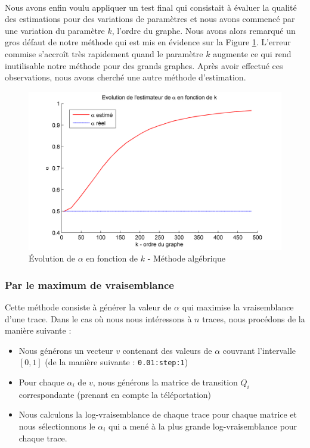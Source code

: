 \documentclass[a4paper,titlepage]{report}
\begin{document}
\paragraph{} 
Nous avons enfin voulu appliquer un test final qui consistait à évaluer la qualité des estimations pour des variations de paramètres et nous avons commencé par une variation du paramètre $k$, l'ordre du graphe. Nous avons alors remarqué un gros défaut de notre méthode qui est mis en évidence sur la Figure \ref{fig:alpha_horrible}. L'erreur commise s'accroît très rapidement quand le paramètre $k$ augmente ce qui rend inutilisable notre méthode pour des grands graphes. Après avoir effectué ces observations, nous avons cherché une autre méthode d'estimation. 
\begin{figure}[ht]
	\center
	\includegraphics[scale=0.5]{../images/alpha_horrible.png}
	\caption{Évolution de $\alpha$ en fonction de $k$ - Méthode algébrique}
	\label{fig:alpha_horrible}
\end{figure}
\subsubsection{Par le maximum de vraisemblance}
Cette méthode consiste à générer la valeur de $\alpha$ qui maximise la vraisemblance d'une trace. Dans le cas où nous nous intéressons à $n$ traces, nous procédons de la manière suivante : 
\begin{itemize}
	\item Nous générons un vecteur $v$ contenant des valeurs de $\alpha$ couvrant l'intervalle $[0,1]$ (de la manière suivante :  \texttt{0.01:step:1})
	\item Pour chaque $\alpha_i$ de $v$, nous générons la matrice de transition $Q_i$ correspondante (prenant en compte la téléportation) 
	\item Nous calculons la log-vraisemblance de chaque trace pour chaque matrice et nous sélectionnons le $\alpha_i$ qui a mené à la plus grande log-vraisemblance pour chaque trace.
\end{itemize}
\end{document}
